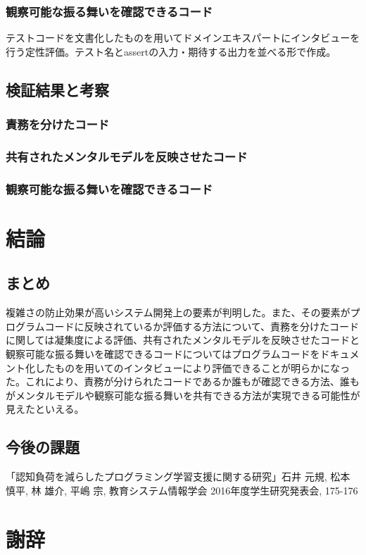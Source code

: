 \documentclass[11pt, a4paper]{jreport}
\begin{document}
\subsection{観察可能な振る舞いを確認できるコード}
テストコードを文書化したものを用いてドメインエキスパートにインタビューを行う定性評価。テスト名とassertの入力・期待する出力を並べる形で作成。
\section{検証結果と考察}
\subsection{責務を分けたコード}
\subsection{共有されたメンタルモデルを反映させたコード}
\subsection{観察可能な振る舞いを確認できるコード}
\chapter{結論}
\section{まとめ}
複雑さの防止効果が高いシステム開発上の要素が判明した。また、その要素がプログラムコードに反映されているか評価する方法について、責務を分けたコードに関しては凝集度による評価、共有されたメンタルモデルを反映させたコードと観察可能な振る舞いを確認できるコードについてはプログラムコードをドキュメント化したものを用いてのインタビューにより評価できることが明らかになった。これにより、責務が分けられたコードであるか誰もが確認できる方法、誰もがメンタルモデルや観察可能な振る舞いを共有できる方法が実現できる可能性が見えたといえる。
\section{今後の課題}

\renewcommand{\bibname}{参考文献}
\begin{thebibliography}{10}
「認知負荷を減らしたプログラミング学習支援に関する研究」石井 元規, 松本 慎平, 林 雄介, 平嶋 宗, 教育システム情報学会 2016年度学生研究発表会, 175-176
\end{thebibliography}

\chapter*{謝辞}
\end{document}
